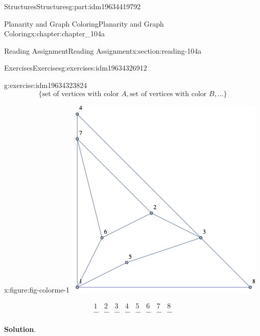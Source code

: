 \documentclass[oneside,10pt,]{book}
\newcommand{\blocktitlefont}{\relax}
\numberwithin{equation}{section}
\begin{document}
\begin{partptx}{Structures}{}{Structures}{}{}{g:part:idm19634419792}
\begin{chapterptx}{Planarity and Graph Coloring}{}{Planarity and Graph Coloring}{}{}{x:chapter:chapter_104a}
\begin{sectionptx}{Reading Assignment}{}{Reading Assignment}{}{}{x:section:reading-104a}
\begin{exercises-subsection-numberless}{Exercises}{}{Exercises}{}{}{g:exercises:idm19634326912}
\begin{exercisegroup}
\begin{divisionexerciseeg}{2}{}{}{g:exercise:idm19634323824}
\begin{equation*}
\{\textrm{set of vertices with color }A, \textrm{set of vertices with color }B, \dots\}
\end{equation*}
%
\begin{sidebyside}{2}{0}{0}{0}%
\begin{sbspanel}{0.5}%
\begin{figureptx}{}{x:figure:fig-colorme-1}{}%
\includegraphics[width=\linewidth]{images/fig-colorme-1.png}
\tcblower
\end{figureptx}%
\end{sbspanel}%
\begin{sbspanel}{0.5}%
%
\begin{equation*}
\begin{array}{cccccccc}
1 & 2 & 3 & 4 & 5 & 6 & 7 & 8 \\
\_\_ & \_\_ & \_\_ & \_\_ & \_\_ &
\_\_ & \_\_ & \_\_ \\
\end{array}
\end{equation*}
%
\end{sbspanel}%
\end{sidebyside}%
\par\smallskip%
\noindent\textbf{\blocktitlefont Solution}.\hypertarget{g:solution:idm19634323696}{}\quad{}%
\end{divisionexerciseeg}%

\end{exercisegroup}
\end{exercises-subsection-numberless}
\end{sectionptx}
\end{chapterptx}
\end{partptx}
\end{document}
